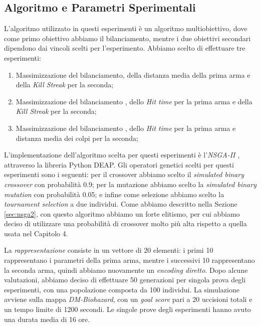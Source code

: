 \documentclass[12pt, italian]{toptesi}
\begin{document}
\subsection{Algoritmo e Parametri Sperimentali}
L'algoritmo utilizzato in questi esperimenti è un algoritmo multiobiettivo, dove come primo obiettivo abbiamo il bilanciamento, mentre i due obiettivi secondari dipendono dai vincoli scelti per l'esperimento.
Abbiamo scelto di effettuare tre esperimenti:
\begin{enumerate}
\item Massimizzazione del bilanciamento, della distanza media della prima arma e della \emph{Kill Streak} per la seconda;
\item Massimizzazione del bilanciamento , dello \emph{Hit time} per la prima arma e della \emph{Kill Streak} per la seconda;
\item Massimizzazione del bilanciamento , dello \emph{Hit time} per la prima arma e distanza media dei colpi per la seconda;
\end{enumerate}
L'implementazione dell'algoritmo scelta per questi esperimenti è l'\emph{NSGA-II} \cite{nsga2:article}, attraverso la libreria {P}ython  DEAP\cite{deap:article}.
Gli operatori genetici scelti per questi esperimenti sono i seguenti:  per il crossover abbiamo scelto il \emph{simulated binary crossover} con probabilità 0.9; per la mutazione abbiamo scelto la \emph{simulated binary mutation} con probabilità 0.05; e infine come selezione abbiamo scelto la \emph{tournament selection} a due individui.
Come abbiamo descritto nella Sezione \ref{sec:nsga2}, con questo algoritmo abbiamo un forte elitismo, per cui abbiamo deciso di utilizzare una probabilità di crossover molto più alta rispetto a quella usata nel Capitolo 4.

La \emph{rappresentazione} consiste in un vettore di 20 elementi: i primi 10 rappresentano i parametri della prima arma, mentre i successivi 10 rappresentano la seconda arma, quindi abbiamo nuovamente un \emph{encoding diretto}.
Dopo alcune valutazioni, abbiamo deciso di effettuare 50 generazioni per singola prova degli esperimenti, con una popolazione composta da 100 individui.
La simulazione avviene sulla mappa \emph{DM-Biohazard}, con un \emph{goal score} pari a 20 uccisioni totali e un tempo limite di 1200 secondi.
Le singole prove degli esperimenti hanno avuto una durata media di 16 ore.
\end{document}
